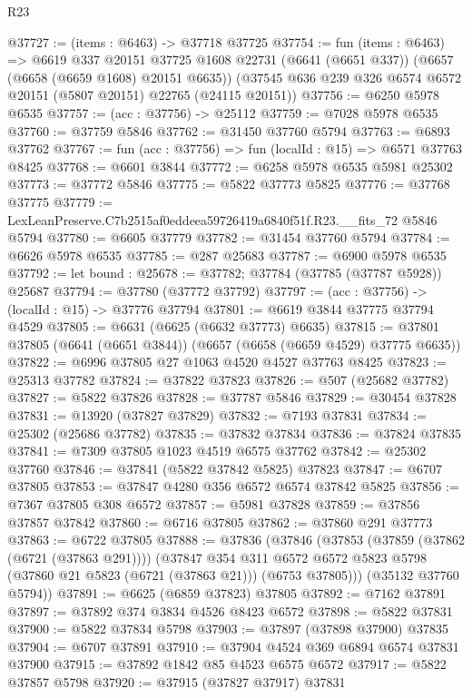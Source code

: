 \begin{lexlean}{R23}
\begin{coremodule}
@37727 := (items : @6463) -> @37718 @37725
@37754 := fun (items : @6463) =>
  @6619
    @337
    @20151
    @37725
    @1608
    @22731
    (@6641 (@6651 @337))
    (@6657 (@6658 (@6659 @1608) @20151 @6635))
    (@37545 @636 @239 @326 @6574 @6572 @20151 (@5807 @20151) @22765 (@24115 @20151))
@37756 := @6250 @5978 @6535
@37757 := (acc : @37756) -> @25112
@37759 := @7028 @5978 @6535
@37760 := @37759 @5846
@37762 := @31450 @37760 @5794
@37763 := @6893 @37762
@37767 := fun (acc : @37756) => fun (localId : @15) => @6571 @37763 @8425
@37768 := @6601 @3844
@37772 := @6258 @5978 @6535 @5981 @25302
@37773 := @37772 @5846
@37775 := @5822 @37773 @5825
@37776 := @37768 @37775
@37779 := LexLeanPreserve.C7b2515af0eddeea59726419a6840f51f.R23.__fits_72 @5846 @5794
@37780 := @6605 @37779
@37782 := @31454 @37760 @5794
@37784 := @6626 @5978 @6535
@37785 := @287 @25683
@37787 := @6900 @5978 @6535
@37792 := let bound : @25678 := @37782; @37784 (@37785 (@37787 @5928)) @25687
@37794 := @37780 (@37772 @37792)
@37797 := (acc : @37756) -> (localId : @15) -> @37776 @37794
@37801 := @6619 @3844 @37775 @37794 @4529
@37805 := @6631 (@6625 (@6632 @37773) @6635)
@37815 := @37801 @37805 (@6641 (@6651 @3844)) (@6657 (@6658 (@6659 @4529) @37775 @6635))
@37822 := @6996 @37805 @27 @1063 @4520 @4527 @37763 @8425
@37823 := @25313 @37782
@37824 := @37822 @37823
@37826 := @507 (@25682 @37782)
@37827 := @5822 @37826
@37828 := @37787 @5846
@37829 := @30454 @37828
@37831 := @13920 (@37827 @37829)
@37832 := @7193 @37831
@37834 := @25302 (@25686 @37782)
@37835 := @37832 @37834
@37836 := @37824 @37835
@37841 := @7309 @37805 @1023 @4519 @6575 @37762
@37842 := @25302 @37760
@37846 := @37841 (@5822 @37842 @5825) @37823
@37847 := @6707 @37805
@37853 := @37847 @4280 @356 @6572 @6574 @37842 @5825
@37856 := @7367 @37805 @308 @6572
@37857 := @5981 @37828
@37859 := @37856 @37857 @37842
@37860 := @6716 @37805
@37862 := @37860 @291 @37773
@37863 := @6722 @37805
@37888 := @37836
    (@37846
      (@37853
        (@37859 (@37862 (@6721 (@37863 @291))))
        (@37847
          @354
          @311
          @6572
          @6572
          @5823
          @5798
          (@37860 @21 @5823 (@6721 (@37863 @21)))
          (@6753 @37805)))
      (@35132 @37760 @5794))
@37891 := @6625 (@6859 @37823) @37805
@37892 := @7162 @37891
@37897 := @37892 @374 @3834 @4526 @8423 @6572
@37898 := @5822 @37831
@37900 := @5822 @37834 @5798
@37903 := @37897 (@37898 @37900) @37835
@37904 := @6707 @37891
@37910 := @37904 @4524 @369 @6894 @6574 @37831 @37900
@37915 := @37892 @1842 @85 @4523 @6575 @6572
@37917 := @5822 @37857 @5798
@37920 := @37915 (@37827 @37917) @37831

\end{coremodule}
\end{lexlean}
